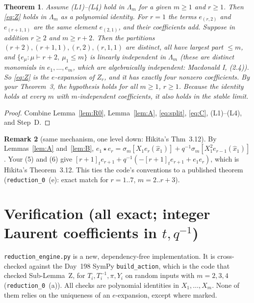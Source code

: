 \documentclass[11pt]{article}
\newcommand{\qint}[1]{[#1]_t}
\newcommand{\tl}{\widehat{x}_1}
\newtheorem{theorem}{Theorem}
\theoremstyle{definition}
\newtheorem{remark}[theorem]{Remark}
\begin{document}
\begin{theorem}\label{thm:main}
Assume (L1)--(L4) hold in $\Lambda_m$ for a given $m\ge1$ and $r\ge1$. Then \eqref{eq:Z}
holds in $\Lambda_m$ as a polynomial identity. For $r=1$ the terms $e_{(r,2)}$ and
$e_{(r+1,1)}$ are the same element $e_{(2,1)}$, and their coefficients add. Suppose in addition
$r\ge2$ and $m\ge r+2$. Then the partitions $(r+2),(r+1,1),(r,2),(r,1,1)$ are distinct,
all have largest part $\le m$, and $\{e_\mu:\mu\vdash r+2,\ \mu_1\le m\}$ is linearly
independent in $\Lambda_m$ (these are distinct monomials in $e_1,\dots,e_m$, which are
algebraically independent: Macdonald I, (2.4)). So \eqref{eq:Z} is \emph{the} $e$-expansion of
$Z_r$, and it has exactly four nonzero coefficients. By your Theorem~3, the hypothesis
holds for all $m\ge1$, $r\ge1$. Because the identity holds at every $m$ with
$m$-independent coefficients, it also holds in the stable limit.
\end{theorem}
\begin{proof}
Combine Lemma~\ref{lem:R0}, Lemma~\ref{lem:A}, \eqref{eq:split}, \eqref{eq:C}, (L1)--(L4), and Step~D.
\end{proof}

\begin{remark}[same mechanism, one level down: Hikita's Thm~3.12]
By Lemmas~\ref{lem:A} and~\ref{lem:B},
$e_1\star e_r=\sigma_m[X_1e_r(\tl)]+q^{-1}\sigma_m[X_1^2e_{r-1}(\tl)]$. Your (5) and (6)
give $\qint{r+1}e_{r+1}+q^{-1}(-\qint{r+1}e_{r+1}+e_1e_r)$, which is Hikita's Theorem~3.12.
This ties the code's conventions to a published theorem (\texttt{reduction\_0}~(e): exact
match for $r=1..7$, $m=2..r+3$).
\end{remark}

\section{Verification (all exact; integer Laurent coefficients in $t,q^{-1}$)}

\texttt{reduction\_engine.py} is a new, dependency-free implementation. It is cross-checked
against the Day~198 SymPy \texttt{build\_action}, which is the code that checked Sub-Lemma~Z, for
$T_i,T_i^{-1},\pi,Y_i$ on random inputs with $m=2,3,4$ (\texttt{reduction\_0}~(a)).
All checks are polynomial identities in $X_1,\dots,X_m$. None of them relies on the
uniqueness of an $e$-expansion, except where marked.
\end{document}
